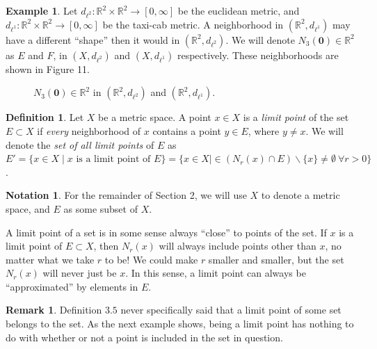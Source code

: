 \documentclass{article}
\newcommand{\R}{\mathbb{R}}
\theoremstyle{definition}
\newtheorem{definition}{Definition}[section]
\newtheorem{note}{Notation}
\newtheorem{example}{Example}[section]
\newtheorem{remark}{Remark}[section]
\begin{document}
\begin{example}
Let $ d_{\ell^2}:\R^2\times\R^2\to[0,\infty] $ be the euclidean metric, and $ d_{\ell^1}:\R^2\times\R^2\to[0,\infty] $ be the taxi-cab metric. A neighborhood in $ (\R^2, d_{\ell^1}) $ may have a different ``shape'' then it would in $ (\R^2, d_{\ell^2}) $. We will denote $ N_{3}(\mathbf{0})\in \R^2 $ as $ E $ and $ F $, in $ (X,d_{\ell^2}) $ and $ (X,d_{\ell^1}) $ respectively. These neighborhoods are shown in Figure 11.     
	\begin{figure}[h!]
	\centering
	\caption{$ N_{3}(\mathbf{0})\in \R^2 $ in $ (\R^2, d_{\ell^2}) $ and $ (\R^2, d_{\ell^1}) $. }
\end{figure}	
\end{example}
\begin{definition}
	Let $ X $ be a metric space. A point $ x\in X $ is a \textit{\color{red}limit point} of the set $ E\subset X $ if \textit{every} neighborhood of $ x $ contains a point $ y\in E $, where $ y\neq x $. We will denote the \textit{\color{red} set of all limit points} of $ E $ as $ E'=\{x\in X\mid x\text{ is a limit point of }E \}=\{x\in X\mid \in (N_r(x)\cap E)\backslash\{x\}\neq\emptyset\ \forall r>0\} $.
\end{definition}
\begin{note}
	For the remainder of Section 2, we will use $ X $ to denote a metric space, and $ E $ as some subset of $ X $. 
\end{note}
A limit point of a set is in some sense always ``close'' to points of the set. If $ x $ is a limit point of $ E\subset X $, then $ N_r(x) $ will always include points other than $ x $, no matter what we take $ r $ to be! We could make $ r $ smaller and smaller, but the set $ N_r(x) $ will never just be $ x $. In this sense, a limit point can always be ``approximated'' by elements in $ E $.  
\begin{remark}
Definition $ 3.5 $ never specifically said that a limit point of some set belongs to the set. As the next example shows, being a limit point has nothing to do with whether or not a point is included in the set in question. 	
\end{remark}
\end{document}
